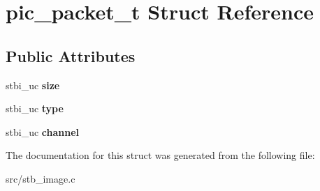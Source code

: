 \hypertarget{structpic__packet__t}{}\section{pic\+\_\+packet\+\_\+t Struct Reference}
\label{structpic__packet__t}
\subsection*{Public Attributes}
\begin{DoxyCompactItemize}
\item 
\hypertarget{structpic__packet__t_ad33021e40c272a20d89bdcceabb20a71}{}stbi\+\_\+uc {\bfseries size}\label{structpic__packet__t_ad33021e40c272a20d89bdcceabb20a71}

\item 
\hypertarget{structpic__packet__t_abc346cfdcff43f051830335296f14aaa}{}stbi\+\_\+uc {\bfseries type}\label{structpic__packet__t_abc346cfdcff43f051830335296f14aaa}

\item 
\hypertarget{structpic__packet__t_af64f17c991495f3f3baf6782a253f7cc}{}stbi\+\_\+uc {\bfseries channel}\label{structpic__packet__t_af64f17c991495f3f3baf6782a253f7cc}

\end{DoxyCompactItemize}


The documentation for this struct was generated from the following file\+:\begin{DoxyCompactItemize}
\item 
src/stb\+\_\+image.\+c\end{DoxyCompactItemize}
